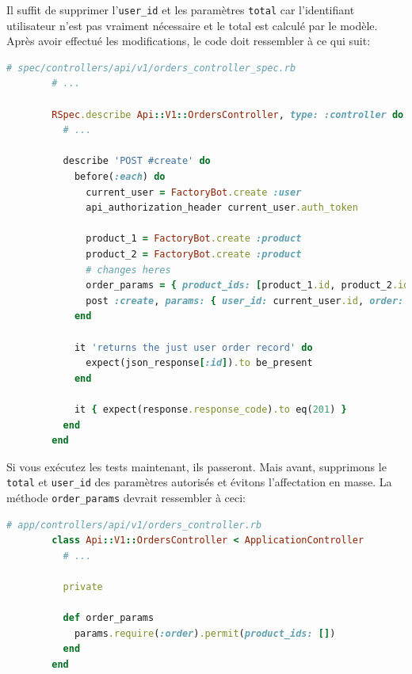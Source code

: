 \documentclass[]{report}
\begin{document}
      Il suffit de supprimer l'\verb|user_id| et les paramètres \verb|total| car l'identifiant utilisateur n'est pas vraiment nécessaire et le total est calculé par le modèle. Après avoir effectué les modifications, le code doit ressembler à ce qui suit:

      \begin{scriptsize}
        \begin{lstlisting}[language=ruby]
        # spec/controllers/api/v1/orders_controller_spec.rb
        # ...

        RSpec.describe Api::V1::OrdersController, type: :controller do
          # ...

          describe 'POST #create' do
            before(:each) do
              current_user = FactoryBot.create :user
              api_authorization_header current_user.auth_token

              product_1 = FactoryBot.create :product
              product_2 = FactoryBot.create :product
              # changes heres
              order_params = { product_ids: [product_1.id, product_2.id] }
              post :create, params: { user_id: current_user.id, order: order_params }
            end

            it 'returns the just user order record' do
              expect(json_response[:id]).to be_present
            end

            it { expect(response.response_code).to eq(201) }
          end
        end
        \end{lstlisting}
      \end{scriptsize}

      Si vous exécutez les tests maintenant, ils passeront. Mais avant, supprimons le \verb|total| et \verb|user_id| des paramètres autorisés et évitons l'affectation en masse. La méthode \verb|order_params| devrait ressembler à ceci:

      \begin{scriptsize}
        \begin{lstlisting}[language=ruby]
        # app/controllers/api/v1/orders_controller.rb
        class Api::V1::OrdersController < ApplicationController
          # ...

          private

          def order_params
            params.require(:order).permit(product_ids: [])
          end
        end
        \end{lstlisting}
      \end{scriptsize}
\end{document}
